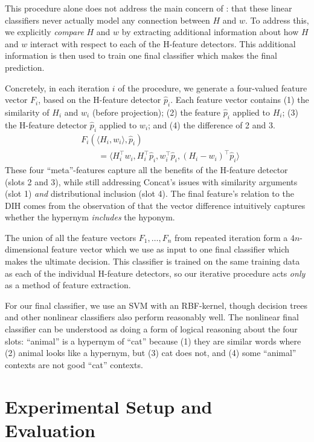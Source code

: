 This procedure alone does not address the main concern of :
that these linear classifiers never actually model any connection between $H$ and $w$.
To address this, we explicitly {\em compare} $H$ and $w$
by extracting additional information about how $H$ and $w$ interact with respect
to each of the H-feature detectors. This additional information is then used to
train one final classifier which makes the final prediction.

Concretely, in each iteration $i$ of the procedure, we generate a four-valued
feature vector
$F_i$, based on the H-feature detector $\hat p_i$. Each
feature vector contains (1) the similarity of $H_i$ and $w_i$ (before projection);
(2) the feature
$\hat p_i$ applied to $H_i$; (3) the H-feature detector $\hat p_i$ applied to $w_i$; and
(4) the difference of 2 and 3.
\begin{align*}
  & F_i(\langle H_i, w_i\rangle, \hat p_i)\\
  & \qquad = \langle H_i^{\top}w_i, H_i^{\top}\hat p_i, w_i^{\top}\hat p_i, (H_i - w_i)^{\top}\hat p_i\rangle
\end{align*}
These four ``meta''-features capture all the benefits of the
H-feature detector (slots 2 and 3), while still addressing Concat's issues with
similarity arguments (slot 1) {\em and} distributional inclusion (slot 4).
The final feature's relation to the DIH comes from the observation of
 that the vector difference intuitively captures
whether the hypernym {\em includes} the hyponym.

The union of all the feature vectors $F_1, \ldots, F_n$ from repeated iteration
form a $4n$-dimensional feature vector which we use as input to one final
classifier which makes the ultimate decision.  This classifier is trained on
the same training data as each of the individual H-feature detectors, so
our iterative procedure acts {\em only} as a method of feature
extraction.

For our final classifier, we use an SVM with an RBF-kernel, though decision
trees and other nonlinear classifiers also perform reasonably well. The
nonlinear final classifier can be understood as doing a form of logical
reasoning about the four slots: ``animal'' is a hypernym of ``cat'' because (1)
they are similar words where (2) animal looks like a hypernym, but (3) cat does
not, and (4) some ``animal'' contexts are not good ``cat'' contexts.


\section{Experimental Setup and Evaluation}

